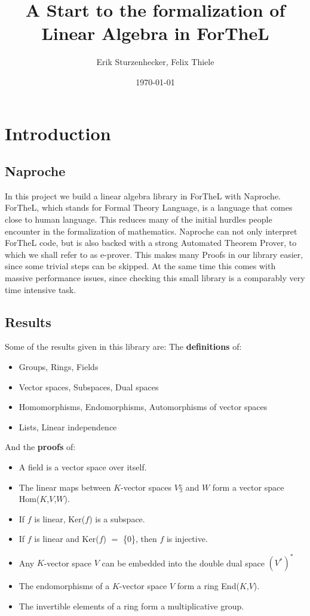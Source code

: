 \documentclass[11pt]{article}
\author{Erik Sturzenhecker, Felix Thiele}
\title{A Start to the formalization of Linear Algebra in ForTheL}
\date{\today}
\begin{document}
\maketitle
\newpage 
\setcounter{tocdepth}{10}
\tableofcontents

\newpage 
\section{Introduction}
\subsection{Naproche}
In this project we build a linear algebra library in ForTheL with Naproche. ForTheL, which stands for Formal Theory Language, is a language that comes close to human language. This reduces many of the initial hurdles people encounter in the formalization of mathematics. Naproche can not only interpret ForTheL code, but is also backed with a strong Automated Theorem Prover, to which we shall refer to as e-prover. This makes many Proofs in our library easier, since some trivial steps can be skipped. At the same time this comes with massive performance issues, since checking this small library is a comparably very time intensive task.

\subsection{Results}
Some of the results given in this library are:
\newline
The \textbf{definitions} of:
\begin{itemize}[nolistsep, noitemsep]
\item Groups, Rings, Fields
\item Vector spaces, Subspaces, Dual spaces
\item Homomorphisms, Endomorphisms, Automorphisms of vector spaces
\item Lists, Linear independence
\end{itemize}
And the \textbf{proofs} of:
\begin{itemize}[nolistsep, noitemsep]
\item A field is a vector space over itself.
\item The linear maps between $K$-vector spaces $V§$ and $W$ form a vector space Hom($K$,$V$,$W$).
\item If $f$ is linear, Ker($f$) is a subspace.
\item If $f$ is linear and Ker($f$) $=$ \{0\}, then $f$ is injective.
\item Any $K$-vector space $V$ can be embedded into the double dual space $(V^{*})^{*}$
\item The endomorphisms of a $K$-vector space $V$ form a ring End($K$,$V$).
\item The invertible elements of a ring form a multiplicative group.
\end{itemize}
\end{document}
